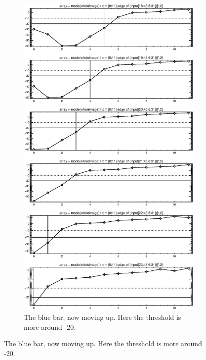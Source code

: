 \documentclass[10pt]{article}
\begin{document}
\begin{figure}[!h]
    \centering 
    \hspace{-1.0in}
    \begin{subfigure}[b]{.4\linewidth}
        \centering
        \includegraphics[width=1.4\textwidth]{plots_tables_images/botleft2.eps} 
        \caption{The blue bar, now moving up. Here the threshold is more around -20. \\}
    \end{subfigure}

\end{figure}
\end{document}
